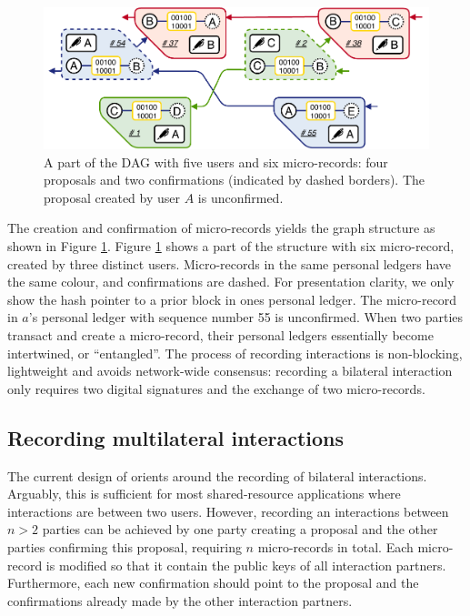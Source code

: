 \begin{figure}[t]
	\centering
	\includegraphics[width=\linewidth]{trustchain/assets/fullchain}
	\caption{A part of the \ModelName{} DAG with five users and six micro-records: four proposals and two confirmations (indicated by dashed borders). The proposal created by user $ A $ is unconfirmed.}
	\label{fig:fullchain}
\end{figure}

The creation and confirmation of micro-records yields the graph structure as shown in Figure \ref{fig:fullchain}.
Figure \ref{fig:fullchain} shows a part of the \ModelName{} structure with six micro-record, created by three distinct users.
Micro-records in the same personal ledgers have the same colour, and confirmations are dashed.
For presentation clarity, we only show the hash pointer to a prior block in ones personal ledger.
The micro-record in $ a $'s personal ledger with sequence number 55 is unconfirmed.
When two parties transact and create a micro-record, their personal ledgers essentially become intertwined, or \enquote{entangled}.
The process of recording interactions is non-blocking, lightweight and avoids network-wide consensus: recording a bilateral interaction only requires two digital signatures and the exchange of two micro-records.

\subsection{Recording multilateral interactions}
The current design of \ModelName{} orients around the recording of bilateral interactions.
Arguably, this is sufficient for most shared-resource applications where interactions are between two users.
However, recording an interactions between $ n > 2 $ parties can be achieved by one party creating a proposal and the other parties confirming this proposal, requiring $ n $ micro-records in total.
Each micro-record is modified so that it contain the public keys of all interaction partners.
Furthermore, each new confirmation should point to the proposal and the confirmations already made by the other interaction partners.

